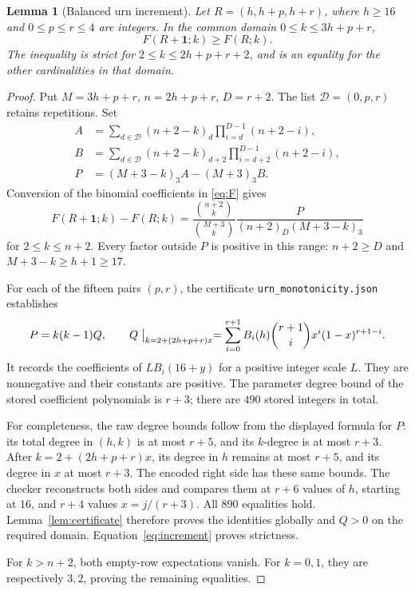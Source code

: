 \documentclass[11pt,a4paper]{article}
\newtheorem{lemma}[theorem]{Lemma}
\theoremstyle{remark}
\newcommand{\one}{\mathbf 1}
\numberwithin{equation}{section}
\begin{document}
\begin{lemma}[Balanced urn increment]\label{lem:increment}
Let \(R=(h,h+p,h+r)\), where \(h\ge16\) and \(0\le p\le r\le4\)
are integers. In the common domain \(0\le k\le3h+p+r\),
\[
 F(R+\one;k)\ge F(R;k).
\]
The inequality is strict for \(2\le k\le2h+p+r+2\), and is an
equality for the other cardinalities in that domain.
\end{lemma}
\begin{proof}
Put \(M=3h+p+r\), \(n=2h+p+r\), \(D=r+2\).
The list \(\mathcal D=(0,p,r)\) retains repetitions. Set
\begin{align*}
 A&=\sum_{d\in\mathcal D}(n+2-k)_d
                      \prod_{i=d}^{D-1}(n+2-i),\\
 B&=\sum_{d\in\mathcal D}(n+2-k)_{d+2}
                      \prod_{i=d+2}^{D-1}(n+2-i),\\
 P&=(M+3-k)_3 A-(M+3)_3 B.
\end{align*}
Conversion of the binomial coefficients in \eqref{eq:F} gives
\begin{equation}\label{eq:increment}
 F(R+\one;k)-F(R;k)
 =\frac{\binom{n+2}k}{\binom{M+3}k}
       \frac{P}{(n+2)_D(M+3-k)_3}
\end{equation}
for \(2\le k\le n+2\). Every factor outside \(P\) is positive
in this range: \(n+2\ge D\) and \(M+3-k\ge h+1\ge17\).

For each of the fifteen pairs \((p,r)\), the certificate
\texttt{urn\_monotonicity.json} establishes
\[
 P=k(k-1)Q,\qquad
 Q\bigm|_{k=2+(2h+p+r)x}
   =\sum_{i=0}^{r+1} B_i(h)\binom{r+1}{i}x^i(1-x)^{r+1-i}.
\]
It records the coefficients of \(L B_i(16+y)\) for a positive
integer scale \(L\). They are nonnegative and their constants are
positive. The parameter degree bound of the stored coefficient
polynomials is \(r+3\); there are \(490\) stored integers in total.

For completeness, the raw degree bounds follow from the displayed
formula for \(P\): its total degree in \((h,k)\) is at most
\(r+5\), and its \(k\)-degree is at most \(r+3\).
After \(k=2+(2h+p+r)x\), its degree in \(h\) remains at most \(r+5\),
and its degree in \(x\) at most \(r+3\). The encoded right side
has these same bounds. The checker reconstructs both sides and
compares them at \(r+6\) values of \(h\), starting at \(16\),
and \(r+4\) values \(x=j/(r+3)\). All \(890\) equalities hold.
Lemma~\ref{lem:certificate} therefore proves the identities globally
and \(Q>0\) on the required domain. Equation~\eqref{eq:increment}
proves strictness.

For \(k>n+2\), both empty-row expectations vanish.
For \(k=0,1\), they are respectively \(3,2\), proving the remaining
equalities.
\end{proof}
\end{document}
